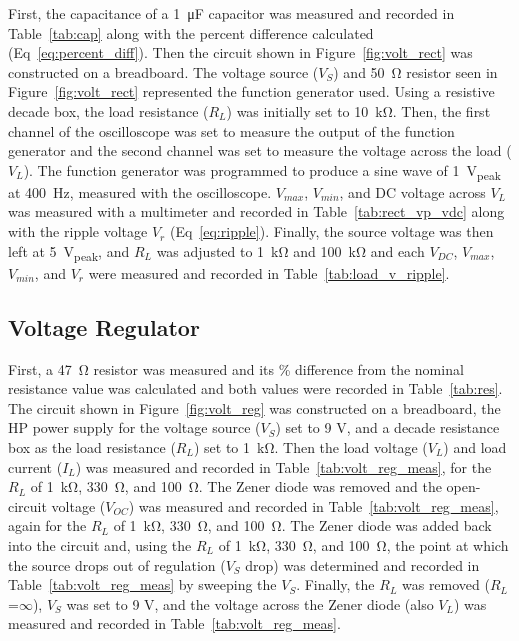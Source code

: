 \documentclass{article}
\begin{document}
First, the capacitance of a \SI{1}{\micro\farad} capacitor was measured and  recorded in Table~\ref{tab:cap} along with the percent difference calculated (Eq~\ref{eq:percent_diff}).  Then the circuit shown in Figure~\ref{fig:volt_rect} was constructed on a breadboard.  The voltage source ($V_S$) and \SI{50}{\ohm} resistor seen in Figure~\ref{fig:volt_rect} represented the function generator used.  Using a resistive decade box, the load resistance ($R_L$) was initially set to \SI{10}{\kilo\ohm}.  Then, the first channel of the oscilloscope was set to measure the output of the function generator and the second channel was set to measure the voltage across the load ($V_L$).  The function generator was programmed to produce a sine wave of \SI{1}{V_{peak}} at \SI{400}{\hertz}, measured with the oscilloscope.  $V_{max}$, $V_{min}$, and DC voltage across $V_L$ was measured with a multimeter and recorded in Table~\ref{tab:rect_vp_vdc} along with the ripple voltage $V_r$ (Eq~\ref{eq:ripple}).  Finally, the source voltage was then left at \SI{5}{V_{peak}}, and $R_L$ was adjusted to \SI{1}{\kilo\ohm} and \SI{100}{\kilo\ohm} and each $V_{DC}$, $V_{max}$, $V_{min}$, and $V_r$ were measured and recorded in Table~\ref{tab:load_v_ripple}.

\subsection{Voltage Regulator}
\label{sec:volt_reg}

First, a \SI{47}{\ohm} resistor was measured and its \% difference from the nominal resistance value was calculated and both values were recorded in Table~\ref{tab:res}.  The circuit shown in Figure~\ref{fig:volt_reg} was constructed on a breadboard, the HP power supply for the voltage source ($V_S$) set to 9 V, and a decade resistance box as the load resistance ($R_L$) set to \SI{1}{\kilo\ohm}.  Then the load voltage ($V_L$) and load current ($I_L$) was measured and recorded in Table~\ref{tab:volt_reg_meas}, for the $R_L$ of \SI{1}{\kilo\ohm}, \SI{330}{\ohm}, and \SI{100}{\ohm}.  The Zener diode was removed and the open-circuit voltage ($V_{OC}$) was measured and recorded in Table~\ref{tab:volt_reg_meas}, again for the $R_L$ of \SI{1}{\kilo\ohm}, \SI{330}{\ohm}, and \SI{100}{\ohm}.  The Zener diode was added back into the circuit and, using the $R_L$ of \SI{1}{\kilo\ohm}, \SI{330}{\ohm}, and \SI{100}{\ohm}, the point at which the source drops out of regulation ($V_S$ drop) was determined and recorded in Table~\ref{tab:volt_reg_meas} by sweeping the $V_S$.  Finally, the $R_L$ was removed ($R_L$=$\infty$), $V_S$ was set to 9 V, and the voltage across the Zener diode (also $V_L$) was measured and recorded in Table~\ref{tab:volt_reg_meas}.
\end{document}
